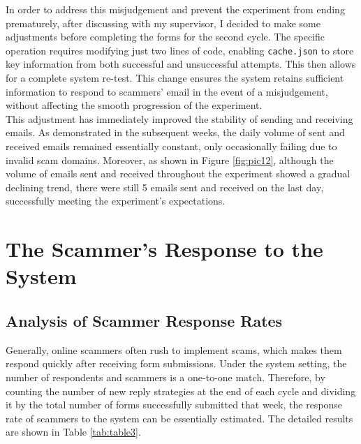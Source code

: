 \documentclass[ oneside,%
                    author={Cassie Qing Tang},
                    degree={BSc},
                     title={An Automated Response System for Disrupting Online Pet Scamming \\ },
                    subtitle={ }]{dissertation}
\begin{document}
In order to address this misjudgement and prevent the experiment from ending prematurely, after discussing with my supervisor, I decided to make some adjustments before completing the forms for the second cycle. The specific operation requires modifying just two lines of code, enabling \texttt{cache.json} to store key information from both successful and unsuccessful attempts. This then allows for a complete system re-test. This change ensures the system retains sufficient information to respond to scammers' email in the event of a misjudgement, without affecting the smooth progression of the experiment.
\\

This adjustment has immediately improved the stability of sending and receiving emails. As demonstrated in the subsequent weeks, the daily volume of sent and received emails remained essentially constant, only occasionally failing due to invalid scam domains. Moreover, as shown in Figure \ref{fig:pic12}, although the volume of emails sent and received throughout the experiment showed a gradual declining trend, there were still 5 emails sent and received on the last day, successfully meeting the experiment's expectations.

\section{The Scammer's Response to the System}
\subsection{Analysis of Scammer Response Rates}
\label{sec:4.2.1}
Generally, online scammers often rush to implement scams, which makes them respond quickly after receiving form submissions. Under the system setting, the number of respondents and scammers is a one-to-one match. Therefore, by counting the number of new reply strategies at the end of each cycle and dividing it by the total number of forms successfully submitted that week, the response rate of scammers to the system can be essentially estimated. The detailed results are shown in Table \ref{tab:table3}.
{\small
\begin{table}[ht]
\centering
{}
\caption{Email Response Rate of Pet Scammers to the System}
\label{tab:table3}
\end{table}
} 
\end{document}
